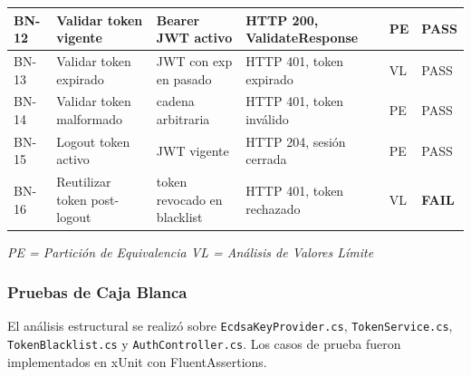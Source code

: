 \documentclass[11pt,a4paper]{article}
\begin{document}
\begin{longtable}{|p{0.9cm}|p{3.2cm}|p{3cm}|p{3.8cm}|p{1.3cm}|p{1.1cm}|}
BN-12 & Validar token vigente & Bearer JWT activo & HTTP 200, ValidateResponse & PE & PASS \\
\hline
BN-13 & Validar token expirado & JWT con exp en pasado & HTTP 401, token expirado & VL & PASS \\
\hline
\rowcolor{rowgray}
BN-14 & Validar token malformado & cadena arbitraria & HTTP 401, token inválido & PE & PASS \\
\hline
BN-15 & Logout token activo & JWT vigente & HTTP 204, sesión cerrada & PE & PASS \\
\hline
\rowcolor{rowgray}
BN-16 & Reutilizar token post-logout & token revocado en blacklist & HTTP 401, token rechazado & VL & \textbf{FAIL} \\
\hline
\end{longtable}

\noindent\textit{PE = Partición de Equivalencia \quad VL = Análisis de Valores Límite}

\subsubsection{Pruebas de Caja Blanca}

El análisis estructural se realizó sobre \texttt{EcdsaKeyProvider.cs}, \texttt{TokenService.cs}, \texttt{TokenBlacklist.cs} y \texttt{AuthController.cs}. Los casos de prueba fueron implementados en xUnit con FluentAssertions.
\end{document}

